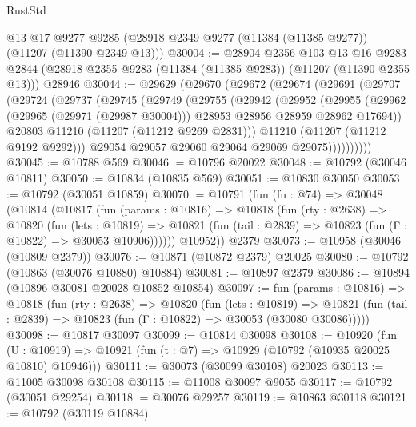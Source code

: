 \begin{lexlean}{RustStd}
\begin{coremodule}
    @13
    @17
    @9277
    @9285
    (@28918 @2349 @9277 (@11384 (@11385 @9277)) (@11207 (@11390 @2349 @13)))
@30004 := @28904
    @2356
    @103
    @13
    @16
    @9283
    @2844
    (@28918 @2355 @9283 (@11384 (@11385 @9283)) (@11207 (@11390 @2355 @13)))
    @28946
@30044 := @29629
    (@29670
      (@29672
        (@29674
          (@29691
            (@29707
              (@29724
                (@29737
                  (@29745
                    (@29749
                      (@29755
                        (@29942
                          (@29952
                            (@29955
                              (@29962
                                (@29965 (@29971 (@29987 @30004)))
                                @28953
                                @28956
                                @28959
                                @28962
                                @17694))
                            @20803
                            @11210
                            (@11207 (@11212 @9269 @2831)))
                          @11210
                          (@11207 (@11212 @9192 @9292)))
                        @29054
                        @29057
                        @29060
                        @29064
                        @29069
                        @29075))))))))))
@30045 := @10788 @569
@30046 := @10796 @20022
@30048 := @10792 (@30046 @10811)
@30050 := @10834 (@10835 @569)
@30051 := @10830 @30050
@30053 := @10792 (@30051 @10859)
@30070 := @10791
    (fun (fn : @74) =>
    @30048
      (@10814
        (@10817
          (fun (params : @10816) =>
          @10818
            (fun (rty : @2638) =>
            @10820
              (fun (lets : @10819) =>
              @10821 (fun (tail : @2839) => @10823 (fun (Γ : @10822) => @30053 @10906))))))
        @10952))
    @2379
@30073 := @10958 (@30046 (@10809 @2379))
@30076 := @10871 (@10872 @2379) @20025
@30080 := @10792 (@10863 (@30076 @10880) @10884)
@30081 := @10897 @2379
@30086 := @10894 (@10896 @30081 @20028 @10852 @10854)
@30097 := fun (params : @10816) =>
  @10818
    (fun (rty : @2638) =>
    @10820
      (fun (lets : @10819) =>
      @10821 (fun (tail : @2839) => @10823 (fun (Γ : @10822) => @30053 (@30080 @30086)))))
@30098 := @10817 @30097
@30099 := @10814 @30098
@30108 := @10920
    (fun (U : @10919) => @10921 (fun (t : @7) => @10929 (@10792 (@10935 @20025 @10810) @10946)))
@30111 := @30073 (@30099 @30108) @20023
@30113 := @11005 @30098 @30108
@30115 := @11008 @30097 @9055
@30117 := @10792 (@30051 @29254)
@30118 := @30076 @29257
@30119 := @10863 @30118
@30121 := @10792 (@30119 @10884)

\end{coremodule}
\end{lexlean}
